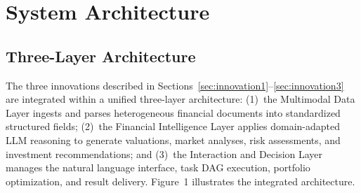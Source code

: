 \documentclass[12pt,letterpaper]{article}
\begin{document}
\section{System Architecture}
\label{sec:system}

\subsection{Three-Layer Architecture}

The three innovations described in Sections~\ref{sec:innovation1}--\ref{sec:innovation3} are integrated
within a unified three-layer architecture: (1)~the Multimodal Data Layer
ingests and parses heterogeneous financial documents into standardized
structured fields; (2)~the Financial Intelligence Layer applies
domain-adapted LLM reasoning to generate valuations, market analyses,
risk assessments, and investment recommendations; and (3)~the Interaction
and Decision Layer manages the natural language interface, task DAG
execution, portfolio optimization, and result delivery.
Figure~1 illustrates the integrated architecture.
\end{document}
